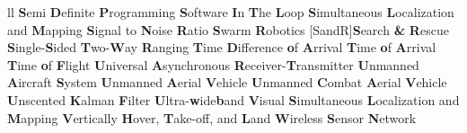 \begin{abbreviations}{ll}
    		{\textbf{S}emi \textbf{D}efinite \textbf{P}rogramming}
    		{\textbf{S}oftware \textbf{I}n \textbf{T}he \textbf{L}oop}
    		{\textbf{S}imultaneous \textbf{L}ocalization and \textbf{M}apping}
    		{\textbf{S}ignal to \textbf{N}oise \textbf{R}atio}
    			{\textbf{S}warm \textbf{R}obotics}
    [SandR]{\textbf{S}earch \textbf{\&} \textbf{R}escue}
    		{\textbf{S}ingle-\textbf{S}ided \textbf{T}wo-\textbf{W}ay \textbf{R}anging}
    		{\textbf{T}ime \textbf{D}ifference \textbf{o}f \textbf{A}rrival}
    		{\textbf{T}ime \textbf{o}f \textbf{A}rrival}
    		{\textbf{T}ime \textbf{o}f \textbf{F}light}
    		{\textbf{U}niversal \textbf{Α}synchronous \textbf{R}eceiver-\textbf{T}ransmitter}
    		{\textbf{U}nmanned \textbf{A}ircraft \textbf{S}ystem}
    		{\textbf{U}nmanned \textbf{A}erial \textbf{V}ehicle}
    		{\textbf{U}nmanned \textbf{C}ombat \textbf{A}erial \textbf{V}ehicle}
    		{\textbf{U}nscented \textbf{K}alman \textbf{F}ilter}
    		{\textbf{U}ltra-\textbf{w}ide\textbf{b}and}
    		{\textbf{V}isual \textbf{S}imultaneous \textbf{L}ocalization and \textbf{M}apping}
    		{\textbf{V}ertically \textbf{H}over, \textbf{T}ake-off, and \textbf{L}and}
    		{\textbf{W}ireless \textbf{S}ensor \textbf{N}etwork}
\end{abbreviations}
